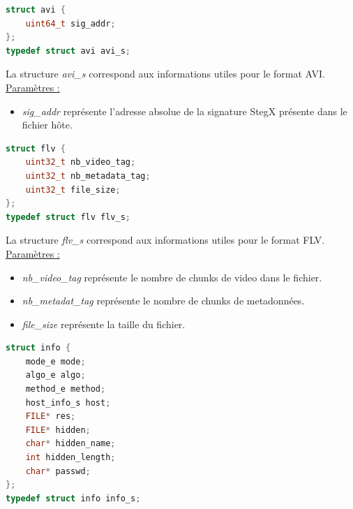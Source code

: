\documentclass[11pt]{article}
\begin{document}
\begin{lstlisting}[language=c]
struct avi {
    uint64_t sig_addr;
};
typedef struct avi avi_s;
\end{lstlisting}

La structure \textit{avi\_s} correspond aux informations 
utiles pour le format AVI.  
\newline
\underline{Paramètres :}
\begin{itemize}
\item \textit{sig\_addr} représente l'adresse absolue de la signature StegX 
présente dans le fichier hôte. 
\newline
\end{itemize}

\begin{lstlisting}[language=c]
struct flv {
    uint32_t nb_video_tag;
    uint32_t nb_metadata_tag;
    uint32_t file_size;
};
typedef struct flv flv_s;
\end{lstlisting}

La structure \textit{flv\_s} correspond aux informations 
utiles pour le format FLV.  
\newline
\underline{Paramètres :}
\begin{itemize}
\item \textit{nb\_video\_tag} représente le nombre de chunks de video dans 
le fichier. 
\item \textit{nb\_metadat\_tag} représente le nombre de chunks de metadonnées. 
\item \textit{file\_size} représente la taille du fichier. 
\newline
\end{itemize}

\begin{lstlisting}[language=c]
struct info {
    mode_e mode;  
    algo_e algo; 
    method_e method;            
    host_info_s host;           
    FILE* res;                 
    FILE* hidden;              
    char* hidden_name;
    int hidden_length; 
    char* passwd;
};
typedef struct info info_s;
\end{lstlisting}
\end{document}
